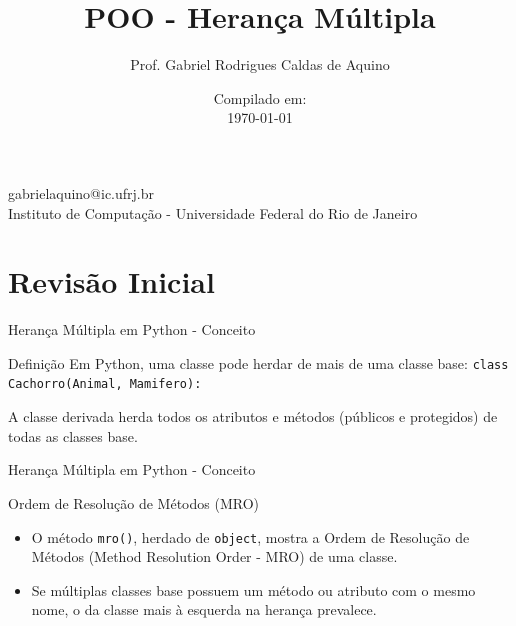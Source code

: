 \title{POO - Herança Múltipla}

\author{Prof. Gabriel Rodrigues Caldas de Aquino}

\institute
{
    gabrielaquino@ic.ufrj.br\\
    
    Instituto de Computação -
    Universidade Federal do Rio de Janeiro %
}
\date{Compilado em: \\ \today} %


\section{Revisão Inicial}

\begin{frame}
    \titlepage
\end{frame}






\begin{frame}{Herança Múltipla em Python - Conceito}

\begin{block}{Definição}
Em Python, uma classe pode herdar de mais de uma classe base:  
\texttt{class Cachorro(Animal, Mamifero):}  

A classe derivada herda todos os atributos e métodos (públicos e protegidos) de todas as classes base.
\end{block}


\end{frame}


\begin{frame}{Herança Múltipla em Python - Conceito}


\begin{block}{Ordem de Resolução de Métodos (MRO)}
\begin{itemize}
    \item O método \texttt{mro()}, herdado de \texttt{object}, mostra a Ordem de Resolução de Métodos (Method Resolution Order - MRO) de uma classe.
    \item Se múltiplas classes base possuem um método ou atributo com o mesmo nome, o da classe mais à esquerda na herança prevalece.
\end{itemize}
\end{block}





\end{frame}




